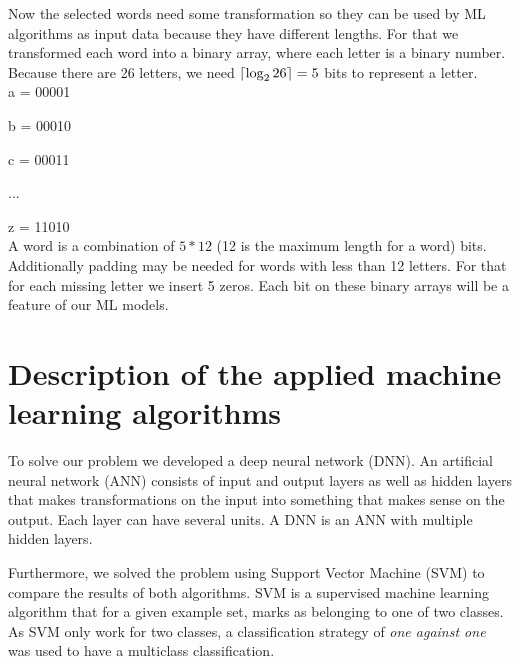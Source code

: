 \documentclass[journal, a4paper]{IEEEtran}
\DeclarePairedDelimiter{\ceil}{\lceil}{\rceil}
\begin{document}
    Now the selected words need some transformation so they can be used by ML algorithms as input 
data because they have different lengths. For that we transformed each word into a binary array, 
where each letter is a binary number. Because there are 26 letters, we need 
\(\ceil[\bid]{\log_2 26}=5\) bits to represent a letter.\\

    a = 00001

    b = 00010

    c = 00011

    ...

    z = 11010\\

    A word is a combination of \(5*12\) (12 is the maximum length for a word) bits. Additionally
padding may be needed for words with less than 12 letters. For that for each missing letter we 
insert 5 zeros. Each bit on these binary arrays will be a feature of our ML models.

\section{Description of the applied machine learning algorithms}
    To solve our problem we developed a deep neural network (DNN). An artificial neural 
network (ANN) consists of input and output layers as well as hidden layers that makes 
transformations on the input into something that makes sense on the output. Each layer 
can have several units. A DNN is an ANN with multiple hidden layers.

    Furthermore, we solved the problem using Support Vector Machine (SVM) to compare 
the results of both algorithms. SVM is a supervised machine learning algorithm that for 
a given example set, marks as belonging to one of two classes. As SVM only work 
for two classes, a classification strategy of \textit{one against one} was used to have 
a multiclass classification.
\end{document}
